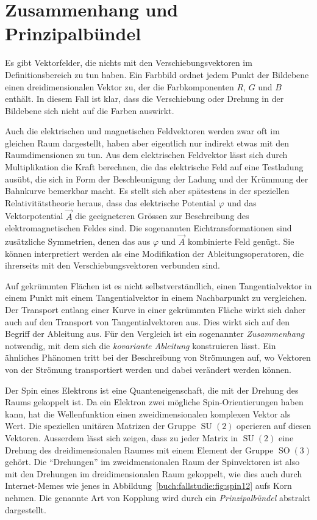 %
%
%

%
%
\section{Zusammenhang und Prinzipalbündel
\label{buch:fallstudie:prinzipalbuendel}}
Es gibt Vektorfelder, die nichts mit den Verschiebungsvektoren im
Definitionsbereich zu tun haben.
Ein Farbbild ordnet jedem Punkt der Bildebene einen dreidimensionalen
Vektor zu, der die Farbkomponenten $R$, $G$ und $B$ enthält.
In diesem Fall ist klar, dass die Verschiebung oder Drehung in der
Bildebene sich nicht auf die Farben auswirkt.

Auch die elektrischen und magnetischen Feldvektoren werden zwar
oft im gleichen Raum dargestellt, haben aber eigentlich nur indirekt
etwas mit den Raumdimensionen zu tun.
Aus dem elektrischen Feldvektor lässt sich durch Multiplikation die
Kraft berechnen, die das elektrische Feld auf eine Testladung ausübt,
die sich in Form der Beschleunigung der Ladung und der Krümmung der
Bahnkurve bemerkbar macht.
Es stellt sich aber spätestens in der speziellen Relativitätstheorie
heraus, dass das elektrische Potential $\varphi$ und das Vektorpotential
$\vec{A}$ die geeigneteren Grössen zur Beschreibung des elektromagnetischen
Feldes sind.
Die sogenannten Eichtransformationen sind zusätzliche Symmetrien, denen
das aus $\varphi$ und $\vec{A}$ kombinierte Feld genügt.
Sie können interpretiert werden als eine Modifikation der
Ableitungsoperatoren, die ihrerseits mit den Verschiebungsvektoren
verbunden sind.

Auf gekrümmten Flächen ist es nicht selbstverständlich, einen
Tangentialvektor in einem Punkt mit einem Tangentialvektor in einem
Nachbarpunkt zu vergleichen.
Der Transport entlang einer Kurve in einer gekrümmten Fläche wirkt
sich daher auch auf den Transport von Tangentialvektoren aus.
Dies wirkt sich auf den Begriff der Ableitung aus.
Für den Vergleich ist ein sogenannter {\em Zusammenhang} notwendig, mit
dem sich die {\em kovariante Ableitung} konstruieren lässt.
Ein ähnliches Phänomen tritt bei der Beschreibung von Strömungen
auf, wo Vektoren von der Strömung transportiert werden und dabei
verändert werden können.

%

Der Spin eines Elektrons ist eine Quanteneigenschaft, die mit der
Drehung des Raums gekoppelt ist.
Da ein Elektron zwei mögliche Spin-Orientierungen haben kann, hat
die Wellenfunktion einen zweidimensionalen komplexen Vektor als Wert.
Die speziellen unitären Matrizen der Gruppe $\operatorname{SU}(2)$ 
operieren auf diesen Vektoren.
Ausserdem lässt sich zeigen, dass zu jeder Matrix in $\operatorname{SU}(2)$
eine Drehung des dreidimensionalen Raumes mit einem Element der
Gruppe $\operatorname{SO}(3)$ gehört.
Die ``Drehungen'' im zweidmensionalen Raum der Spinvektoren ist also
mit den Drehungen im dreidimensionalen Raum gekoppelt, wie dies auch
durch Internet-Memes wie jenes in Abbildung~\ref{buch:fallstudie:fig:spin12}
aufs Korn nehmen.
Die genannte Art von Kopplung wird durch ein {\em Prinzipalbündel}
abstrakt dargestellt.


